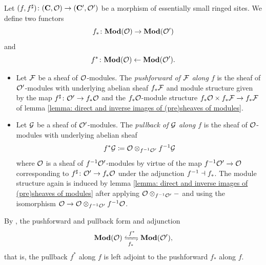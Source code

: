 \begin{lemma}
	\label{lemma: pullback and pushforward of sheaves of modules}
	
	Let $(f,f^\sharp)\colon ({{\mathbf{C}}}, {\mathcal{O}}) \to ({{\mathbf{C}}}',{\mathcal{O}}')$ be a morphism of essentially small ringed sites. We define two functors
		$$f_\ast\colon {{\mathbf{Mod}}({\mathcal{O}})}\rightarrow{{\mathbf{Mod}}({\mathcal{O}}')}$$
	and
		$$f^\ast\colon {{\mathbf{Mod}}({\mathcal{O}})}\leftarrow {{\mathbf{Mod}}({\mathcal{O}}')}.$$
	\begin{itemize}
		\item
		Let ${\mathcal{F}}$ be a sheaf of ${\mathcal{O}}$-modules. The \emph{pushforward of ${\mathcal{F}}$ along $f$} is the sheaf of ${\mathcal{O}}'$-modules with underlying abelian sheaf $f_\ast {\mathcal{F}}$ and module structure given by the map $f^\sharp\colon {\mathcal{O}}'\to f_\ast {\mathcal{O}}$ and the $f_\ast{\mathcal{O}}$-module structure $f_\ast{\mathcal{O}}\times f_\ast{\mathcal{F}}\to f_\ast{\mathcal{F}}$ of lemma \ref{lemma: direct and inverse images of (pre)sheaves of modules}.
		
		\item
		Let ${\mathcal{G}}$ be a sheaf of ${\mathcal{O}}'$-modules. The \emph{pullback of ${\mathcal{G}}$ along $f$} is the sheaf of ${\mathcal{O}}$-modules with underlying abelian sheaf
			$$f^\ast{\mathcal{G}}\coloneqq {\mathcal{O}}\otimes_{f^{-1}{\mathcal{O}}'} f^{-1}{\mathcal{G}}$$
		where ${\mathcal{O}}$ is a sheaf of $f^{-1}{\mathcal{O}}'$-modules by virtue of the map $f^{-1}{\mathcal{O}}'\to{\mathcal{O}}$ corresponding to $f^\sharp\colon {\mathcal{O}}'\to f_\ast{\mathcal{O}}$ under the adjunction $f^{-1}\dashv f_\ast$. The module structure again is induced by lemma \ref{lemma: direct and inverse images of (pre)sheaves of modules} after applying ${\mathcal{O}} \otimes_{f^{-1}{\mathcal{O}}'} -$ and using the isomorphism ${\mathcal{O}} \to {\mathcal{O}}\otimes_{f^{-1}{\mathcal{O}}'} f^{-1}{\mathcal{O}}$.
	\end{itemize}
	
	By \cite[\href{https://stacks.math.columbia.edu/tag/03D7}{Tag 03D7}]{stacks-project}, the pushforward and pullback form and adjunction
		$$\mod{\structsymbol}\xleftrightarrows{f^\ast}{f_\ast}\mod{\structsymbol'},$$
	that is, the pullback $f^\ast$ along $f$ is left adjoint to the pushforward $f_\ast$ along $f$.
\end{lemma}

